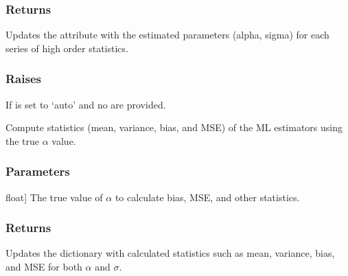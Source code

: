 \documentclass[a4paper,11pt,openany,english]{sphinxmanual}
\begin{document}
\begin{fulllineitems}
\begin{fulllineitems}
\begin{description}
\end{description}


\subsubsection{Returns}
\label{\detokenize{api_topt:id73}}\begin{description}
\sphinxAtStartPar
Updates the  attribute with the estimated parameters (alpha, sigma) for each series 
of high order statistics.

\end{description}


\subsubsection{Raises}
\label{\detokenize{api_topt:id74}}\begin{description}
\sphinxAtStartPar
If  is set to ‘auto’ and no  are provided.

\end{description}

\end{fulllineitems}


\begin{fulllineitems}
\label{\detokenize{api_topt:xtremes.topt.Frechet_ML_estimators.get_statistics}}
\pysigstartsignatures
{}
\pysigstopsignatures
\sphinxAtStartPar
Compute statistics (mean, variance, bias, and MSE) of the ML estimators using the true \(\alpha\) value.


\subsubsection{Parameters}
\label{\detokenize{api_topt:id75}}\begin{description}
\sphinxlineitem{alpha\_true}{[}float{]}
\sphinxAtStartPar
The true value of \(\alpha\) to calculate bias, MSE, and other statistics.

\end{description}


\subsubsection{Returns}
\label{\detokenize{api_topt:id76}}\begin{description}
\sphinxAtStartPar
Updates the  dictionary with calculated statistics such as mean, variance, bias, 
and MSE for both \(\alpha\) and \(\sigma\).


\end{description}
\end{fulllineitems}
\end{fulllineitems}
\end{document}

